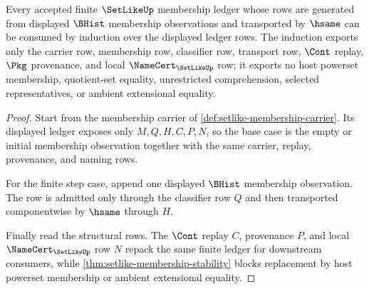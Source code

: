 \begin{theorem}
\label{thm:setlike-finite-membership-induction}
Every accepted finite $\SetLikeUp$ membership ledger whose rows are generated from displayed $\BHist$ membership observations and transported by $\hsame$ can be consumed by induction over the displayed ledger rows. The induction exports only the carrier row, membership row, classifier row, transport row, $\Cont$ replay, $\Pkg$ provenance, and local $\NameCert_{\SetLikeUp}$ row; it exports no host powerset membership, quotient-set equality, unrestricted comprehension, selected representatives, or ambient extensional equality.
\end{theorem}
\begin{proof}
Start from the membership carrier of \autoref{def:setlike-membership-carrier}. Its displayed ledger exposes only $M,Q,H,C,P,N$, so the base case is the empty or initial membership observation together with the same carrier, replay, provenance, and naming rows.

For the finite step case, append one displayed $\BHist$ membership observation. The row is admitted only through the classifier row $Q$ and then transported componentwise by $\hsame$ through $H$.

Finally read the structural rows. The $\Cont$ replay $C$, provenance $P$, and local $\NameCert_{\SetLikeUp}$ row $N$ repack the same finite ledger for downstream consumers, while \autoref{thm:setlike-membership-stability} blocks replacement by host powerset membership or ambient extensional equality.
\end{proof}

